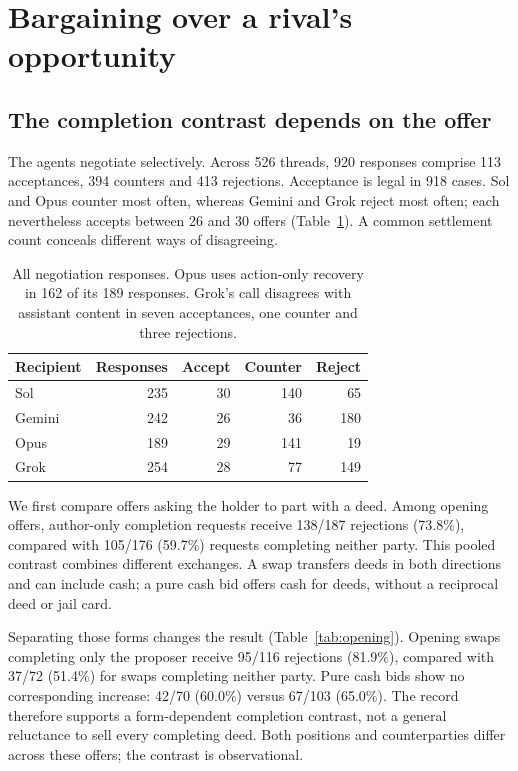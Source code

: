 \section{Bargaining over a rival's opportunity}
\label{sec:bargaining}

\subsection{The completion contrast depends on the offer}
The agents negotiate selectively. Across 526 threads, 920 responses comprise 113 acceptances, 394 counters and 413 rejections. Acceptance is legal in 918 cases. Sol and Opus counter most often, whereas Gemini and Grok reject most often; each nevertheless accepts between 26 and 30 offers (Table~\ref{tab:responses}). A common settlement count conceals different ways of disagreeing.

\begin{table}[t]\centering\small
\begin{tabular}{@{}lrrrr@{}}\toprule
Recipient & Responses & Accept & Counter & Reject\\\midrule
Sol&235&30&140&65\\
Gemini&242&26&36&180\\
Opus&189&29&141&19\\
Grok&254&28&77&149\\\bottomrule
\end{tabular}
\caption{All negotiation responses. Opus uses action-only recovery in 162 of its 189 responses. Grok's call disagrees with assistant content in seven acceptances, one counter and three rejections.}
\label{tab:responses}\end{table}

We first compare offers asking the holder to part with a deed. Among opening offers, author-only completion requests receive 138/187 rejections (73.8\%), compared with 105/176 (59.7\%) requests completing neither party. This pooled contrast combines different exchanges. A swap transfers deeds in both directions and can include cash; a pure cash bid offers cash for deeds, without a reciprocal deed or jail card.

Separating those forms changes the result (Table~\ref{tab:opening}). Opening swaps completing only the proposer receive 95/116 rejections (81.9\%), compared with 37/72 (51.4\%) for swaps completing neither party. Pure cash bids show no corresponding increase: 42/70 (60.0\%) versus 67/103 (65.0\%). The record therefore supports a form-dependent completion contrast, not a general reluctance to sell every completing deed. Both positions and counterparties differ across these offers; the contrast is observational.

